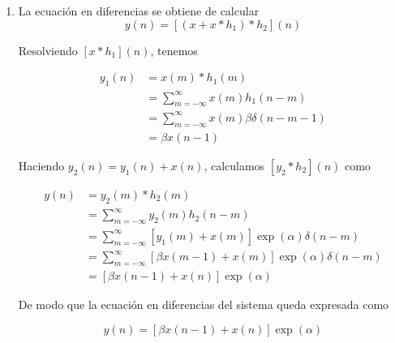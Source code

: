 \documentclass[a4paper,12pt,final]{article}
\begin{document}
      \begin{enumerate}[label=\alph*)]
        \item La ecuación en diferencias se obtiene de calcular
          $$ y\left(n\right) = \left[\left(x + x*h_1\right)*h_2\right]\left(n\right) $$

          \noindent Resolviendo $\left[x*h_1\right]\left(n\right)$, tenemos

          \begin{equation*}
            \begin{split}
              y_1\left(n\right) & = x(m)*h_1(m) \\
                                & = \sum_{m=-\infty}^{\infty} x\left(m\right)h_1\left(n-m\right) \\
                                & = \sum_{m=-\infty}^{\infty} x\left(m\right)\beta\delta\left(n-m-1\right) \\
                                & = \beta x\left(n-1\right)
            \end{split}
          \end{equation*}

          \noindent Haciendo $y_2\left(n\right)=y_1\left(n\right) + x\left(n\right)$, calculamos $\left[y_2*h_2\right]\left(n\right)$ como

          \begin{equation*}
            \begin{split}
              y\left(n\right) & = y_2(m)*h_2(m) \\
                              & = \sum_{m=-\infty}^{\infty} y_2(m)h_2\left(n-m\right) \\
                              & = \sum_{m=-\infty}^{\infty} \left[y_1\left(m\right) + x\left(m\right)\right]\exp\left(\alpha\right)\delta\left(n-m\right) \\
                              & = \sum_{m=-\infty}^{\infty} \left[\beta x\left(m-1\right) + x\left(m\right)\right]\exp\left(\alpha\right)\delta\left(n-m\right) \\
                              & = \left[\beta x\left(n-1\right) + x\left(n\right)\right]\exp\left(\alpha\right)
            \end{split}
          \end{equation*}

          \noindent De modo que la ecuación en diferencias del sistema queda expresada como

          $$y\left(n\right) = \left[\beta x\left(n-1\right) + x\left(n\right)\right]\exp\left(\alpha\right)$$


\end{enumerate}
\end{document}
